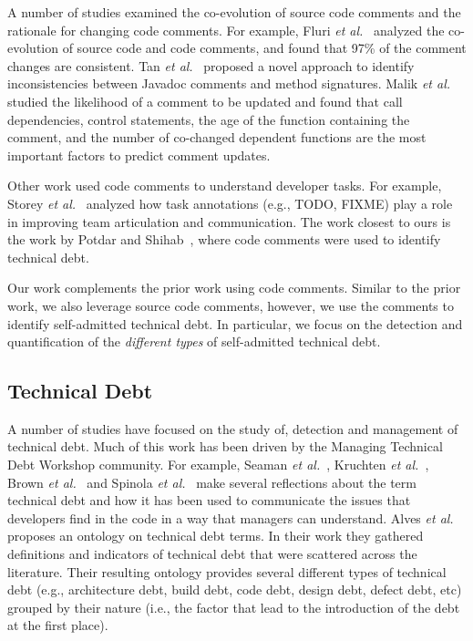 A number of studies examined the co-evolution of source code comments and the rationale for changing code comments. For example, Fluri \textit{et al.}~\cite{Fluri2007WCRE} analyzed the co-evolution of source code and code comments, and found that 97\% of the comment changes are consistent. Tan \textit{et al.}~\cite{Tan2012ICST} proposed a novel approach to identify inconsistencies between Javadoc comments and method signatures. Malik \textit{et al.}~\cite{Malik2008ICSM} studied the likelihood of a comment to be updated and found that call dependencies, control statements, the age of the function containing the comment, and the number of co-changed dependent functions are the most important factors to predict comment updates.

Other work used code comments to understand developer tasks. For example, Storey \textit{et al.}~\cite{Storey2008ICSE} analyzed how task annotations (e.g., TODO, FIXME) play a role in improving team articulation and communication. The work closest to ours is the work by Potdar and Shihab~\cite{Potdar2014ICSME}, where code comments were used to identify technical debt. 

Our work complements the prior work using code comments. Similar to the prior work, we also leverage source code comments, however, we use the comments to identify self-admitted technical debt. In particular, we focus on the detection and quantification of the \emph{different types} of self-admitted technical debt.

\subsection{Technical Debt}

A number of studies have focused on the study of, detection and management of technical debt. Much of this work has been driven by the Managing Technical Debt Workshop community. For example, Seaman \textit{et al.}~\cite{Seaman2011}, Kruchten \textit{et al.}~\cite{Kruchten2013IWMTD}, Brown \textit{et al.}~\cite{Brown2010MTD} and Spinola \textit{et al.}~\cite{Spinola2013MTD}  make several reflections about the term technical debt and how it has been used to communicate the issues that developers find in the code in a way that managers can understand. Alves \textit{et al.}~\cite{Alves2014MTD} proposes an ontology on technical debt terms. In their work they gathered definitions and indicators of technical debt that were scattered across the literature. Their resulting ontology provides several different types of technical debt (e.g., architecture debt, build debt, code debt, design debt, defect debt, etc) grouped by their nature (i.e., the factor that lead to the introduction of the debt at the first place).  

